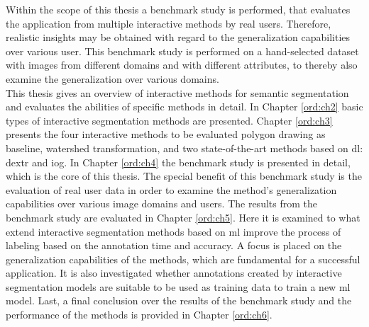 Within the scope of this thesis a benchmark study is performed, that evaluates the application from multiple interactive methods by real users. 
Therefore, realistic insights may be obtained with regard to the generalization capabilities over various user.
This benchmark study is performed on a hand-selected dataset with images from different domains and with different attributes, to thereby also examine the generalization over various domains.
\\
\newline
This thesis gives an overview of interactive methods for semantic segmentation and evaluates the abilities of specific methods in detail.
In Chapter \ref{ord:ch2} basic types of interactive segmentation methods are presented.
Chapter \ref{ord:ch3} presents the four interactive methods to be evaluated polygon drawing as baseline, watershed transformation, and two state-of-the-art methods based on \gls{dl}: \gls{dextr} and \gls{iog}.
In Chapter \ref{ord:ch4} the benchmark study is presented in detail, which is the core of this thesis.
The special benefit of this benchmark study is the evaluation of real user data in order to examine the method's generalization capabilities over various image domains and users.
The results from the benchmark study are evaluated in Chapter \ref{ord:ch5}.
Here it is examined to what extend interactive segmentation methods based on \gls{ml} improve the process of labeling based on the annotation time and accuracy.
A focus is placed on the generalization capabilities of the methods, which are fundamental for a successful application.
It is also investigated whether annotations created by interactive segmentation models are suitable to be used as training data to train a new \gls{ml} model.
Last, a final conclusion over the results of the benchmark study and the performance of the methods is provided in Chapter \ref{ord:ch6}.

